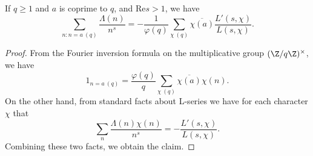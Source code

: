 \begin{lemma}
\label{WeakPNT-character}
\leanok
If $q ≥ 1$ and $a$ is coprime to $q$, and $\mathrm{Re} s > 1$, we have
  $$
  \sum_{n: n = a\ (q)} \frac{\Lambda(n)}{n^s} = - \frac{1}{\varphi(q)} \sum_{\chi\ (q)}
  \overline{\chi(a)} \frac{L'(s,\chi)}{L(s,\chi)}.$$
\end{lemma}
\begin{proof}
\leanok
From the Fourier inversion formula on the multiplicative group $(\Z/q\Z)^\times$, we have
  $$ 1_{n=a\ (q)} = \frac{\varphi(q)}{q} \sum_{\chi\ (q)} \overline{\chi(a)} \chi(n).$$
  On the other hand, from standard facts about L-series we have for each character $\chi$ that
  $$
  \sum_{n} \frac{\Lambda(n) \chi(n)}{n^s} = - \frac{L'(s,\chi)}{L(s,\chi)}.$$
  Combining these two facts, we obtain the claim.
\end{proof}
